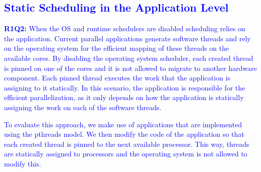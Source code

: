 \textcolor{blue}{
\subsection{Static Scheduling in the Application Level}
\textbf{R1Q2: }When the OS and runtime schedulers are disabled scheduling relies on the application. 
Current parallel applications generate software threads and rely on the operating system for the efficient mapping of these threads on the available cores. 
By disabling the operating system scheduler, each created thread is pinned on one of the cores and it is not allowed to migrate to another hardware component. 
Each pinned thread executes the work that the application is assigning to it statically. 
In this scenario, the application is responsible for the efficient parallelization, as it only depends on how the application is statically assigning the work on each of the software threads. 
}

\textcolor{blue}{
To evaluate this approach, we make use of applications that are implemented using the pthreads model. 
We then modify the code of the application so that each created thread is pinned to the next available processor.
This way, threads are statically assigned to processors and the operating system is not allowed to modify this.
%
%
}



